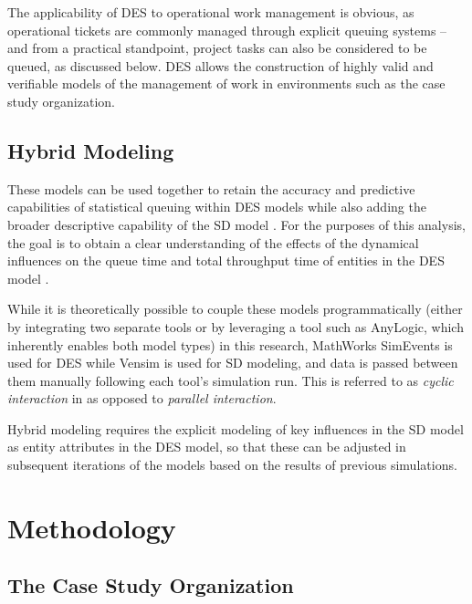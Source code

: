 \documentclass[conference]{IEEEtran}
\begin{document}
The applicability of DES to operational work management is obvious, as operational tickets are commonly managed through explicit queuing systems -- and from a practical standpoint, project tasks can also be considered to be queued, as discussed below. DES allows the construction of highly valid and verifiable models of the management of work in environments such as the case study organization. 

\subsection{Hybrid Modeling}

These models can be used together to retain the accuracy and predictive capabilities of statistical queuing within DES models while also adding the broader descriptive capability of the SD model \cite{gonul-sezer_comparison_2016} \cite{chahal_conceptual_2013}. For the purposes of this analysis, the goal is to obtain a clear understanding of the effects of the dynamical influences on the queue time and total throughput time of entities in the DES model \cite{greasley_simulating_2019}.

While it is theoretically possible to couple these models programmatically (either by integrating two separate tools or by leveraging a tool such as AnyLogic, which inherently enables both model types) in this research, MathWorks SimEvents is used for DES while Vensim is used for SD modeling, and data is passed between them manually following each tool's simulation run. This is referred to as \textit{cyclic interaction} in \cite{chahal_conceptual_2013} as opposed to \textit{parallel interaction}.

Hybrid modeling requires the explicit modeling of key influences in the SD model as entity attributes in the DES model, so that these can be adjusted in subsequent iterations of the models based on the results of previous simulations.



\section{Methodology}
\label{sec:methodology}

\subsection{The Case Study Organization}
\end{document}
